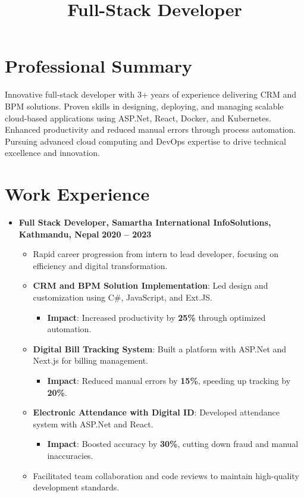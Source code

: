 \documentclass[11pt,a4paper,sans]{moderncv}
\title{Full-Stack Developer}
\newcommand{\sectionseparator}{\vspace{5pt}\par\noindent\makebox[\linewidth]{\rule{\textwidth}{0.4pt}}\vspace{5pt}}
\begin{document}
\makecvtitle

\section{Professional Summary}
Innovative full-stack developer with 3+ years of experience delivering CRM and BPM solutions. Proven skills in designing, deploying, and managing scalable cloud-based applications using ASP.Net, React, Docker, and Kubernetes. Enhanced productivity and reduced manual errors through process automation. Pursuing advanced cloud computing and DevOps expertise to drive technical excellence and innovation.

\sectionseparator

\section{Work Experience}
\begin{itemize}[leftmargin=*]
    \item \textbf{Full Stack Developer, Samartha International InfoSolutions, Kathmandu, Nepal} 
    \hfill \textbf{2020 -- 2023}
    \begin{itemize}
        \item Rapid career progression from intern to lead developer, focusing on efficiency and digital transformation.
        \item \textbf{CRM and BPM Solution Implementation}: Led design and customization using C\#, JavaScript, and Ext.JS.
        \begin{itemize}
            \item \textbf{Impact}: Increased productivity by \textbf{25\%} through optimized automation.
        \end{itemize}
        \item \textbf{Digital Bill Tracking System}: Built a platform with ASP.Net and Next.js for billing management.
        \begin{itemize}
            \item \textbf{Impact}: Reduced manual errors by \textbf{15\%}, speeding up tracking by \textbf{20\%}.
        \end{itemize}
        \item \textbf{Electronic Attendance with Digital ID}: Developed attendance system with ASP.Net and React.
        \begin{itemize}
            \item \textbf{Impact}: Boosted accuracy by \textbf{30\%}, cutting down fraud and manual inaccuracies.
        \end{itemize}
        \item Facilitated team collaboration and code reviews to maintain high-quality development standards.
    \end{itemize}
\end{itemize}
\end{document}
